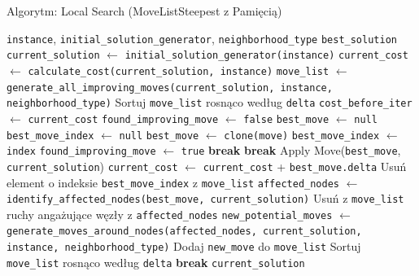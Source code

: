 \documentclass[12pt,a4paper]{article}
\begin{document}
\begin{algorithm}[H]
\caption{Algorytm: Local Search (MoveListSteepest z Pamięcią)}
\label{alg:move_list}
\begin{algorithmic}[1]
\Require \texttt{instance}, \texttt{initial\_solution\_generator}, \texttt{neighborhood\_type}
\Ensure \texttt{best\_solution}
\State \texttt{current\_solution} $\leftarrow$ \texttt{initial\_solution\_generator(instance)}
\State \texttt{current\_cost} $\leftarrow$ \texttt{calculate\_cost(current\_solution, instance)}
\State \texttt{move\_list} $\leftarrow$ \texttt{generate\_all\_improving\_moves(current\_solution, instance, neighborhood\_type)}
\State Sortuj \texttt{move\_list} rosnąco według \texttt{delta}
\Loop
    \State \texttt{cost\_before\_iter} $\leftarrow$ \texttt{current\_cost}
    \State \texttt{found\_improving\_move} $\leftarrow$ \texttt{false}
    \State \texttt{best\_move} $\leftarrow$ \texttt{null}
    \State \texttt{best\_move\_index} $\leftarrow$ \texttt{null}
            \State \texttt{best\_move} $\leftarrow$ \texttt{clone(move)}
            \State \texttt{best\_move\_index} $\leftarrow$ \texttt{index}
            \State \texttt{found\_improving\_move} $\leftarrow$ \texttt{true}
            \State \textbf{break} 
        \EndIf
    \EndFor
        \State \textbf{break} 
    \EndIf
    \State Apply Move(\texttt{best\_move}, \texttt{current\_solution})
    \State \texttt{current\_cost} $\leftarrow$ \texttt{current\_cost} + \texttt{best\_move.delta}
    \State Usuń element o indeksie \texttt{best\_move\_index} z \texttt{move\_list}
    \State \texttt{affected\_nodes} $\leftarrow$ \texttt{identify\_affected\_nodes(best\_move, current\_solution)}
    \State Usuń z \texttt{move\_list} ruchy angażujące węzły z \texttt{affected\_nodes}
    \State \texttt{new\_potential\_moves} $\leftarrow$ \texttt{generate\_moves\_around\_nodes(affected\_nodes, current\_solution, instance, neighborhood\_type)}
            \State Dodaj \texttt{new\_move} do \texttt{move\_list}
        \EndIf
    \EndFor
    \State Sortuj \texttt{move\_list} rosnąco według \texttt{delta}
        \State \textbf{break}
    \EndIf
\EndLoop
\State \Return \texttt{current\_solution}
\end{algorithmic}
\end{algorithm}
\end{document}
